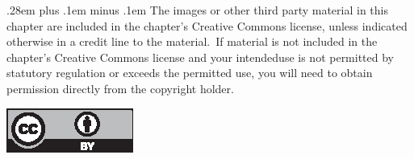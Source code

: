 \documentclass[runningheads]{llncs}
\begin{document}
{\small \spaceskip .28em plus .1em minus .1em The images or other third party material in this chapter are included in the chapter's Creative Commons license, unless indicated otherwise in a credit line to the material.~If material is not included in the chapter's Creative Commons license and your intended\break use is not permitted by statutory regulation or exceeds the permitted use, you will need to obtain permission directly from the copyright holder.}

\medskip\noindent\includegraphics{cc_by_4-0.eps}
\end{document}
